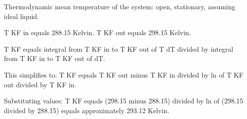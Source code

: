 Thermodynamic mean temperature of the system: open, stationary, assuming ideal liquid.  

T KF in equals 288.15 Kelvin.  
T KF out equals 298.15 Kelvin.  

T KF equals integral from T KF in to T KF out of T dT divided by integral from T KF in to T KF out of dT.  

This simplifies to:  
T KF equals T KF out minus T KF in divided by ln of T KF out divided by T KF in.  

Substituting values:  
T KF equals (298.15 minus 288.15) divided by ln of (298.15 divided by 288.15) equals approximately 293.12 Kelvin.